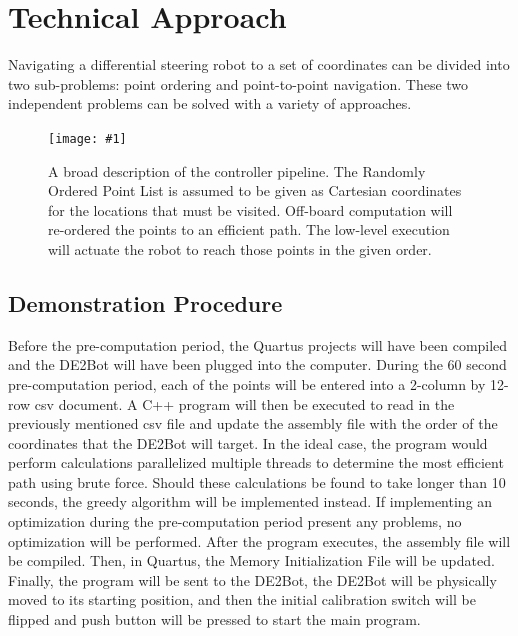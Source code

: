 \documentclass[11pt,conference,onecolumn]{article} %
\newcommand{\myfigure}[4]{
  \begin{figure}[h!]
      \centering
      \texttt{[image: \#1]}
      \caption{#2}
\label{#4}
    \end{figure}
}
\begin{document}
\section*{Technical Approach}

Navigating a differential steering robot to a set of coordinates can be divided into two sub-problems: point ordering and point-to-point navigation. These two independent problems can be solved with a variety of approaches.

\myfigure{images/Pipeline.jpg}{A broad description of the controller pipeline. The Randomly Ordered Point List is assumed to be given as Cartesian coordinates for the locations that must be visited. Off-board computation will re-ordered the points to an efficient path. The low-level execution will actuate the robot to reach those points in the given order.}{0.5}{fig:pipeline}
\subsection*{Demonstration Procedure}
Before the pre-computation period, the Quartus projects will have been compiled and the DE2Bot will have been plugged into the computer. During the 60 second pre-computation period, each of the points will be entered into a 2-column by 12-row csv document. A C++ program will then be executed to read in the previously mentioned csv file and update the assembly file with the order of the coordinates that the DE2Bot will target. In the ideal case, the program would perform calculations parallelized multiple threads to determine the most efficient path using brute force. Should these calculations be found to take longer than 10 seconds, the greedy algorithm will be implemented instead. If implementing an optimization during the pre-computation period present any problems, no optimization will be performed. After the program executes, the assembly file will be compiled. Then, in Quartus, the Memory Initialization File will be updated. Finally, the program will be sent to the DE2Bot, the DE2Bot will be physically moved to its starting position, and then the initial calibration switch will be flipped and push button will be pressed to start the main program.
\end{document}

